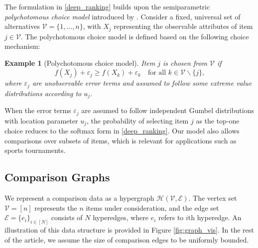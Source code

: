\documentclass[
  12pt]{article}
\newtheorem{example}{Example}
\begin{document}
The formulation in \eqref{deep_ranking} builds upon the semiparametric \textit{polychotomous choice model} introduced by \citet{matzkin1991semiparametric}. %
Consider a fixed, universal set of alternatives  \(\mathcal{V}=\{1,\ldots,n\}\), with \(X_j\) representing the observable attributes of item \(j \in \mathcal{V}\). The polychotomous choice model is defined based on the following choice mechanism:
\begin{example}[Polychotomous choice model]
\label{matzkin}
Item $j$ is chosen from $\mathcal{V}$ if 
$$f\left(X_j\right)+\varepsilon_j \geq f\left(X_k\right)+\varepsilon_k \quad \text{for all } k \in \mathcal{V}\backslash\{j\},$$
where $\varepsilon_j$ are unobservable error terms and assumed to follow some extreme value distributions according to $u_j$. 
\end{example}
When the error terms $\varepsilon_j$ are assumed to follow independent Gumbel distributions with location parameter $u_j$, the probability of selecting item $j$ as the top-one choice reduces to the softmax form in \eqref{deep_ranking}. Our model also allows comparisons over subsets of items, which is relevant for applications such as sports tournaments. 

\subsection{Comparison Graphs}\label{Random_Graph_Model}

We represent a comparison data as a hypergraph $\mathcal{H}(\mathcal{V},\mathcal{E})$. The vertex set $\mathcal{V}=[n]$ represents the $n$ items under consideration, and the edge set $\mathcal{E}=\{e_i\}_{i\in [N]}$ consists of $N$ hyperedges, where $e_i$ refers to $i$th hyperedge. An illustration of this data structure is provided in Figure \ref{fig:graph_vis}. In the rest of the article, we assume the size of comparison edges to be uniformly bounded.
\end{document}
